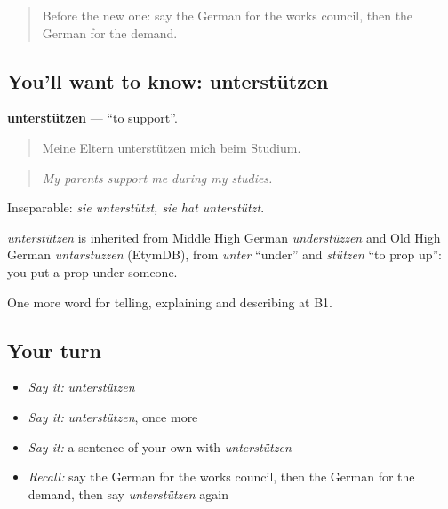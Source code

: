 \label{lesson:GE-C357-unterstuetzen}



\begin{quote}
Before the new one: say the German for the works council, then the German for the demand.
\end{quote}

\subsection*{You'll want to know: unterstützen}
\textbf{unterstützen} — \textquotedblleft{}to support\textquotedblright{}.

\begin{quote}
Meine Eltern unterstützen mich beim Studium.
\end{quote}

\begin{quote}
\emph{My parents support me during my studies.}
\end{quote}

Inseparable: \emph{sie unterstützt, sie hat unterstützt}.

\begin{cousinweb}
\emph{unterstützen} is inherited from Middle High German \emph{understüzzen} and Old High German \emph{untarstuzzen} (EtymDB), from \emph{unter} \textquotedblleft{}under\textquotedblright{} and \emph{stützen} \textquotedblleft{}to prop up\textquotedblright{}: you put a prop under someone.
\end{cousinweb}

\begin{grammarlens}[title={What you've built}]
One more word for telling, explaining and describing at B1.
\end{grammarlens}

\subsection*{Your turn}
\begin{itemize}
\raggedright
  \item \emph{Say it:} \emph{unterstützen}
  \item \emph{Say it:} \emph{unterstützen}, once more
  \item \emph{Say it:} a sentence of your own with \emph{unterstützen}
  \item \emph{Recall:} say the German for the works council, then the German for the demand, then say \emph{unterstützen} again
\end{itemize}


